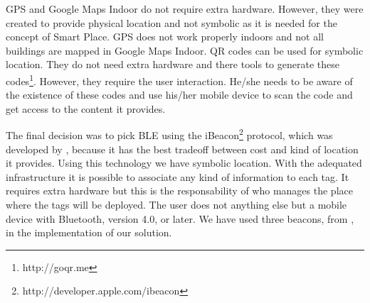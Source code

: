 

\gls{GPS} and Google Maps Indoor do not require extra hardware. However, they were created to provide physical location and not symbolic as it is needed for the concept of Smart Place.
\gls{GPS} does not work properly indoors and not all buildings are mapped in Google Maps Indoor.
\gls{QR} codes can be used for symbolic location. They do not need extra hardware and there tools to generate these codes\footnote{http://goqr.me}.
However, they require the user interaction. He/she needs to be aware of the existence of these codes and use his/her mobile device to scan the code and get access to the content it provides.

The final decision was to pick \gls{BLE} using the iBeacon\footnote{http://developer.apple.com/ibeacon} protocol, which was developed by , because it has the best tradeoff between cost and kind of location it provides. Using this technology we have symbolic location. With the adequated infrastructure it is possible to associate any kind of information to each tag.
It requires extra hardware but this is the responsability of who manages the place where the tags will be deployed.
The user does not anything else but a mobile device with Bluetooth, version 4.0, or later.
We have used three beacons, from , in the implementation of our solution.
